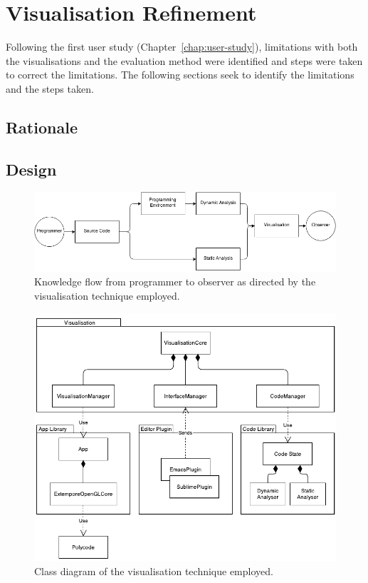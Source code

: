 
\chapter{Visualisation Refinement}
\label{chap:visualisation-refinement}

Following the first user study (Chapter~\ref{chap:user-study}), limitations with both the visualisations and the evaluation method were identified and steps were taken to correct the limitations. The following sections seek to identify the limitations and the steps taken.

\section{Rationale}



\section{Design}

\begin{figure}
  \centering \includegraphics[width=\columnwidth]{../images/diagrams/knowledge-flow}
  \caption{Knowledge flow from programmer to observer as directed by the visualisation technique employed.}
\label{fig:knowledge-flow}
\end{figure}

\begin{figure}
  \centering \includegraphics[width=\columnwidth]{../images/diagrams/visualisation-class-diagram}
  \caption{Class diagram of the visualisation technique employed.}
\label{fig:visualisation-class-diagram}
\end{figure}

